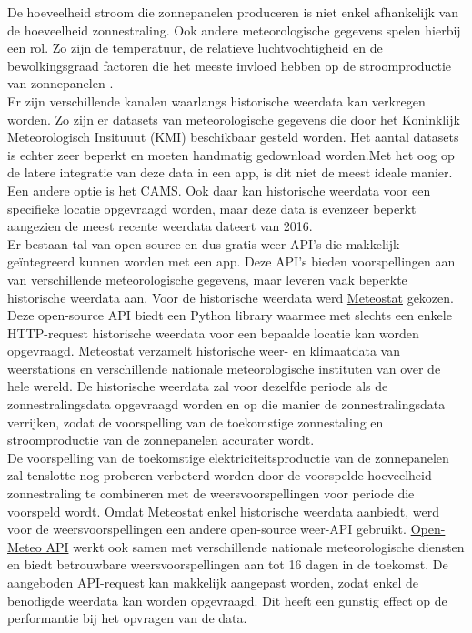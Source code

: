 De hoeveelheid stroom die zonnepanelen produceren is niet enkel afhankelijk van de hoeveelheid zonnestraling. Ook andere meteorologische gegevens spelen hierbij een rol. Zo zijn de temperatuur, de relatieve luchtvochtigheid en de bewolkingsgraad factoren die het meeste invloed hebben op de stroomproductie van zonnepanelen \autocite{Sehrawat2023}. \\

Er zijn verschillende kanalen waarlangs historische weerdata kan verkregen worden. Zo zijn er datasets van meteorologische gegevens die door het Koninklijk Meteorologisch Insituuut (KMI) beschikbaar gesteld worden. Het aantal datasets is echter zeer beperkt en moeten handmatig gedownload worden.Met het oog op de latere integratie van deze data in een app, is dit niet de meest ideale manier. Een andere optie is het CAMS. Ook daar kan historische weerdata voor een specifieke locatie opgevraagd worden, maar deze data is evenzeer beperkt aangezien de meest recente weerdata dateert van 2016. \\

Er bestaan tal van open source en dus gratis weer API's die makkelijk geïntegreerd kunnen worden met een app. Deze API's bieden voorspellingen aan van verschillende meteorologische gegevens, maar leveren vaak beperkte historische weerdata aan. Voor de historische weerdata werd \href{https://dev.meteostat.net/}{Meteostat} gekozen. Deze open-source API biedt een Python library waarmee met slechts een enkele HTTP-request historische weerdata voor een bepaalde locatie kan worden opgevraagd. Meteostat verzamelt historische weer- en klimaatdata van weerstations en verschillende nationale meteorologische instituten van over de hele wereld. De historische weerdata zal voor dezelfde periode als de zonnestralingsdata opgevraagd worden en op die manier de zonnestralingsdata verrijken, zodat de voorspelling van de toekomstige zonnestaling en stroomproductie van de zonnepanelen accurater wordt. \\

De voorspelling van de toekomstige elektriciteitsproductie van de zonnepanelen zal tenslotte nog proberen verbeterd worden door de voorspelde hoeveelheid zonnestraling te combineren met de weersvoorspellingen voor periode die voorspeld wordt. Omdat Meteostat enkel historische weerdata aanbiedt, werd voor de weersvoorspellingen een andere open-source weer-API gebruikt. \href{https://open-meteo.com/}{Open-Meteo API} werkt ook samen met verschillende nationale meteorologische diensten en biedt betrouwbare weersvoorspellingen aan tot 16 dagen in de toekomst. De aangeboden API-request kan makkelijk aangepast worden, zodat enkel de benodigde weerdata kan worden opgevraagd. Dit heeft een gunstig effect op de performantie bij het opvragen van de data.


